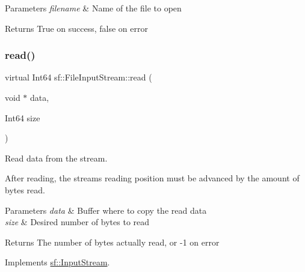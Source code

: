 \begin{DoxyParams}{Parameters}
{\em filename} & Name of the file to open\\
\hline
\end{DoxyParams}
\begin{DoxyReturn}{Returns}
True on success, false on error \begin{DoxyVerb}\end{DoxyVerb}
 
\end{DoxyReturn}
\mbox{\label{classsf_1_1_file_input_stream_ad1e94c4152429f485db224c44ee1eb50}} 
\subsubsection{\texorpdfstring{read()}{read()}}
{\footnotesize\ttfamily virtual Int64 sf\+::\+File\+Input\+Stream\+::read (\begin{DoxyParamCaption}\item[{void $\ast$}]{data,  }\item[{Int64}]{size }\end{DoxyParamCaption})\hspace{0.3cm}{\ttfamily [virtual]}}



Read data from the stream. 

After reading, the stream\textquotesingle{}s reading position must be advanced by the amount of bytes read.


\begin{DoxyParams}{Parameters}
{\em data} & Buffer where to copy the read data \\
\hline
{\em size} & Desired number of bytes to read\\
\hline
\end{DoxyParams}
\begin{DoxyReturn}{Returns}
The number of bytes actually read, or -\/1 on error \begin{DoxyVerb}\end{DoxyVerb}
 
\end{DoxyReturn}


Implements \mbox{\hyperlink{classsf_1_1_input_stream_a8dd89c74c1acb693203f50e750c6ae53}{sf\+::\+Input\+Stream}}.

\mbox{\label{classsf_1_1_file_input_stream_abdaf5700d4e1de07568e7829106b4eb9}} 
